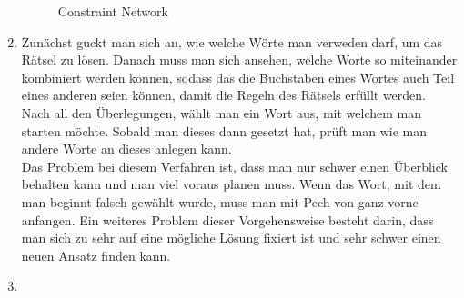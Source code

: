 \documentclass[a4paper]{scrartcl}
\begin{document}
\begin{enumerate}
\begin{landscape}
\begin{figure}[h]
                \caption{Constraint Network}
                \label{fig:constraints}
            \end{figure}
            \vspace*{\fill}
        \end{landscape}
	   
    \item
	Zunächst guckt man sich an, wie welche Wörte man verweden darf, um das Rätsel zu lösen. Danach
	muss man sich ansehen, welche Worte so miteinander kombiniert werden können, sodass das die Buchstaben
	eines Wortes auch Teil eines anderen seien können, damit die Regeln des Rätsels erfüllt werden. \\
	Nach all den Überlegungen, wählt man ein Wort aus, mit welchem man starten möchte. Sobald man dieses 
	dann gesetzt hat, prüft man wie man andere Worte an dieses anlegen kann. \\
	Das Problem bei diesem Verfahren ist, dass man nur schwer einen Überblick behalten kann und man viel
	voraus planen muss. Wenn das Wort, mit dem man beginnt falsch gewählt wurde, muss man mit Pech von
	ganz vorne anfangen. Ein weiteres Problem dieser Vorgehensweise besteht darin, dass man sich zu sehr 
	auf eine mögliche Lösung fixiert ist und sehr schwer einen neuen Ansatz finden kann. \\

    \item

\end{enumerate}
\end{document}
